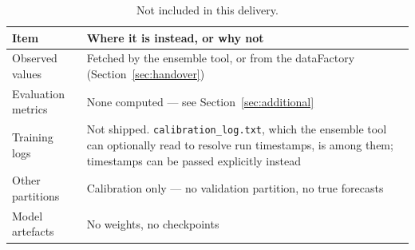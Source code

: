 \begin{table}[h!]
\centering
\renewcommand{\arraystretch}{1.3}
\caption{Not included in this delivery.}
\label{tab:not-included}
\begin{tabular}{@{}p{4cm}p{10cm}@{}}
\toprule
\textbf{Item} & \textbf{Where it is instead, or why not} \\ \midrule
Observed values     & Fetched by the ensemble tool, or from the dataFactory
                      (Section~\ref{sec:handover}) \\
Evaluation metrics  & None computed --- see Section~\ref{sec:additional} \\
Training logs       & Not shipped. \texttt{calibration\_log.txt}, which the ensemble tool can
                      optionally read to resolve run timestamps, is among them; timestamps can be
                      passed explicitly instead \\
Other partitions    & Calibration only --- no validation partition, no true forecasts \\
Model artefacts     & No weights, no checkpoints \\
\bottomrule
\end{tabular}
\end{table}
